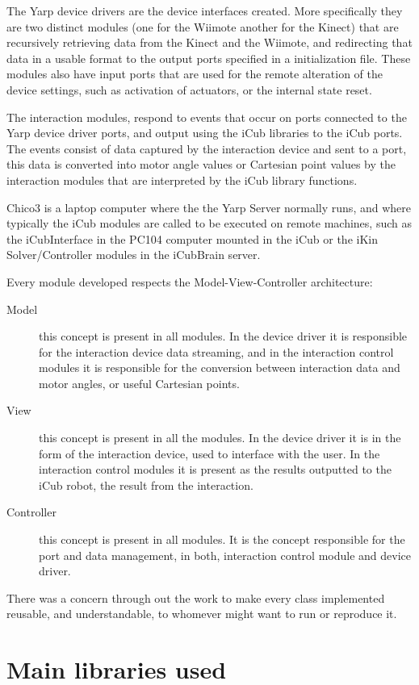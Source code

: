 	The Yarp device drivers are the device interfaces created. More specifically they are two distinct modules (one for the \ac{Wiimote} another for the Kinect) that are recursively retrieving data from the Kinect and the \ac{Wiimote}, and redirecting that data in a usable format to the output ports specified in a initialization file. These modules also have input ports that are used for the remote alteration of the device settings, such as activation of actuators, or the internal state reset.
	
	The interaction modules, respond to events that occur on ports connected to the Yarp device driver ports, and output using the iCub libraries to the iCub ports. The events consist of data captured by the interaction device and sent to a port, this data is converted into motor angle values or Cartesian point values by the interaction modules that are interpreted by the iCub library functions.
	
	Chico3 is a laptop computer where the the Yarp Server normally runs, and where typically the iCub modules are called to be executed on remote machines, such as the iCubInterface in the PC104 computer mounted in the iCub or the iKin Solver/Controller modules in the iCubBrain server.
	
	Every module developed respects the Model-View-Controller architecture:
\begin{description}
\item[Model] this concept is present in all modules. In the device driver it is responsible for the interaction device data streaming, and in the interaction control modules it is responsible for the conversion between interaction data and motor angles, or useful Cartesian points.
\item[View] this concept is present in all the modules. In the device driver it is in the form of the interaction device, used to interface with the user. In the interaction control modules it is present as the results outputted to the iCub robot, the result from the interaction.
\item[Controller] this concept is present in all modules. It is the concept responsible for the port and data management, in both, interaction control module and device driver.
\end{description}

	There was a concern through out the work to make every class implemented reusable, and understandable, to whomever might want to run or reproduce it.

\section{Main libraries used}
	
